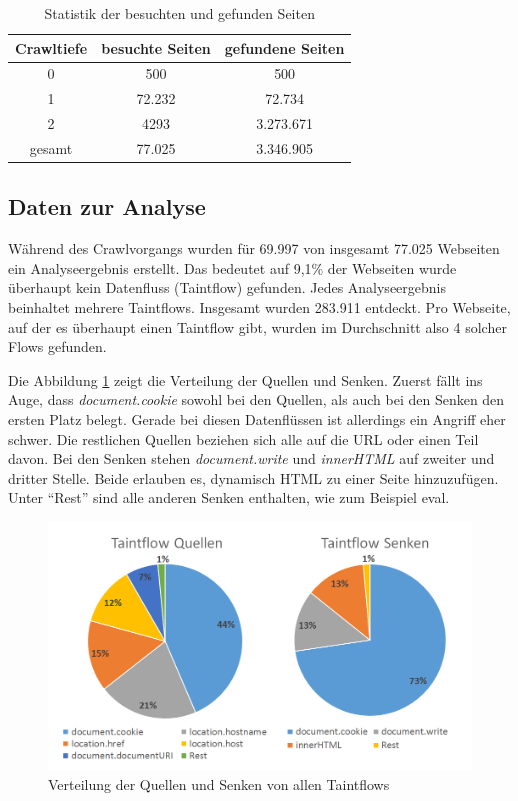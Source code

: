 \begin{table}
\centering
\begin{tabular}{|c|c|c|}
	\hline 
	Crawltiefe & besuchte Seiten & gefundene Seiten \\ 
	\hline 
	0 & 500 & 500 \\ 
	\hline 
	1 & 72.232 & 72.734 \\ 
	\hline 
	2 & 4293 & 3.273.671 \\ 
	\hline 
	\hline
	gesamt  & 77.025 & 3.346.905 \\ 
	\hline 
\end{tabular} 
\caption{Statistik der besuchten und gefunden Seiten}
\label{tab:StatistikBesuchteSeiten}
\end{table}

\subsection{Daten zur Analyse}
Während des Crawlvorgangs wurden für 69.997 von insgesamt 77.025 Webseiten ein Analyseergebnis erstellt. Das bedeutet auf 9,1\% der Webseiten wurde überhaupt kein Datenfluss (Taintflow) gefunden. Jedes Analyseergebnis beinhaltet mehrere Taintflows. Insgesamt wurden 283.911 entdeckt. Pro Webseite, auf der es überhaupt einen Taintflow gibt, wurden im Durchschnitt also 4 solcher Flows gefunden. 

Die Abbildung \ref{fig:VerteilungQuellenSenken}  zeigt die Verteilung der Quellen und Senken. Zuerst fällt ins Auge, dass \textit{document.cookie} sowohl bei den Quellen, als auch bei den Senken den ersten Platz belegt. Gerade bei diesen Datenflüssen ist allerdings ein Angriff eher schwer. Die restlichen Quellen beziehen sich alle auf die URL oder einen Teil davon. Bei den Senken stehen \textit{document.write} und \textit{innerHTML} auf zweiter und dritter Stelle. Beide erlauben es, dynamisch HTML zu einer Seite hinzuzufügen. Unter \enquote{Rest} sind alle anderen Senken enthalten, wie zum Beispiel eval. 

\begin{figure}[h]
	\centering
	\hspace*{-1cm}
	\vspace*{-0.5cm}
	\includegraphics[width=1.15\textwidth]{Bilder/Diagram1.png}
	\caption{Verteilung der Quellen und Senken von allen Taintflows}
	\label{fig:VerteilungQuellenSenken}
\end{figure}

